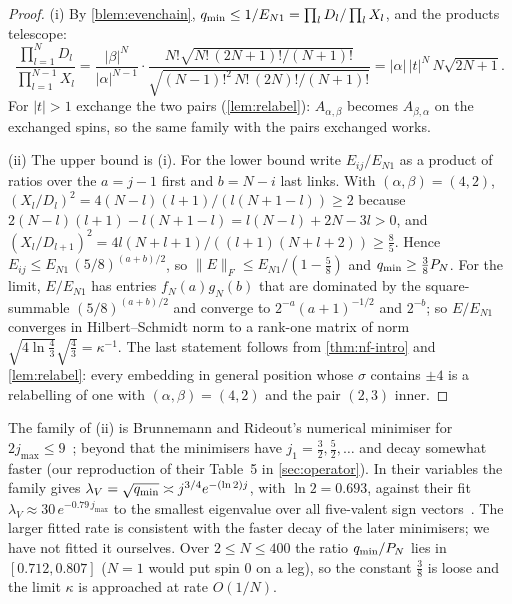 \begin{proof}
(i) By \cref{blem:evenchain}, $q_{\min}\le1/E_{N1}=\prod_lD_l/\prod_lX_l$, and the products
telescope:
\[
  \frac{\prod_{l=1}^ND_l}{\prod_{l=1}^{N-1}X_l}
  =\frac{|\beta|^N}{|\alpha|^{N-1}}\cdot\frac{N!\sqrt{N!\,(2N+1)!/(N+1)!}}
  {\sqrt{(N-1)!^2\,N!\,(2N)!/(N+1)!}}=|\alpha|\,|t|^N\,N\sqrt{2N+1}.
\]
For $|t|>1$ exchange the two pairs (\cref{lem:relabel}): $A_{\alpha,\beta}$ becomes
$A_{\beta,\alpha}$ on the exchanged spins, so the same family with the pairs exchanged
works.

(ii) The upper bound is (i). For the lower bound write $E_{ij}/E_{N1}$ as a product of
ratios over the $a=j-1$ first and $b=N-i$ last links. With $(\alpha,\beta)=(4,2)$,
$(X_l/D_l)^2=4(N-l)(l+1)/(l(N+1-l))\ge2$ because $2(N-l)(l+1)-l(N+1-l)=l(N-l)+2N-3l>0$,
and $(X_l/D_{l+1})^2=4l(N+l+1)/((l+1)(N+l+2))\ge\frac85$. Hence
$E_{ij}\le E_{N1}\,(5/8)^{(a+b)/2}$, so $\|E\|_F\le E_{N1}/(1-\frac58)$ and
$q_{\min}\ge\frac38P_N$. For the limit, $E/E_{N1}$ has entries $f_N(a)g_N(b)$ that are
dominated by the square-summable $(5/8)^{(a+b)/2}$ and converge to $2^{-a}(a+1)^{-1/2}$
and $2^{-b}$; so $E/E_{N1}$ converges in Hilbert--Schmidt norm to a rank-one matrix
of norm $\sqrt{4\ln\frac43}\sqrt{\frac43}=\kappa^{-1}$. The last statement follows from
\cref{thm:nf-intro} and \cref{lem:relabel}: every embedding in general position whose $\sigma$ contains
$\pm4$ is a relabelling of one with $(\alpha,\beta)=(4,2)$ and the pair $(2,3)$ inner.
\end{proof}

The family of (ii) is Brunnemann and Rideout's numerical minimiser for
$2j_{\max}\le9$~\cite[Table~5]{BR2008b}; beyond that the minimisers have $j_1=\frac32,
\frac52,\dots$ and decay somewhat faster (our reproduction of their Table~5 in \cref{sec:operator}). In their variables
the family gives $\lambda_V=\sqrt{q_{\min}}\asymp j^{3/4}e^{-(\ln2)j}$, with $\ln2=0.693$,
against their fit $\lambda_V\approx30\,e^{-0.79\,j_{\max}}$ to the smallest eigenvalue
over all five-valent sign vectors~\cite[Table~3]{BR2008a}. The larger fitted rate is
consistent with the faster decay of the later minimisers; we have not fitted it
ourselves. Over $2\le N\le400$ the
ratio $q_{\min}/P_N$ lies in $[0.712,0.807]$ ($N=1$ would put spin $0$ on a leg), so the constant $\frac38$ is loose and the
limit $\kappa$ is approached at rate $O(1/N)$.

